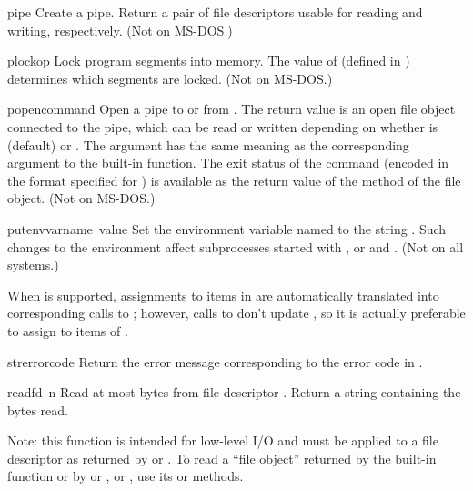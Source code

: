 \begin{funcdesc}{pipe}{}
Create a pipe.  Return a pair of file descriptors  usable for reading and writing, respectively.
(Not on MS-DOS.)
\end{funcdesc}

\begin{funcdesc}{plock}{op}
Lock program segments into memory.  The value of 
(defined in ) determines which segments are locked.
(Not on MS-DOS.)
\end{funcdesc}

\begin{funcdesc}{popen}{command}
Open a pipe to or from .  The return value is an open
file object connected to the pipe, which can be read or written
depending on whether  is  (default) or .
The  argument has the same meaning as the corresponding
argument to the built-in  function.  The exit status of
the command (encoded in the format specified for ) is
available as the return value of the  method of the file
object.
(Not on MS-DOS.)
\end{funcdesc}

\begin{funcdesc}{putenv}{varname\, value}
Set the environment variable named  to the string
.  Such changes to the environment affect subprocesses
started with ,  or
 and .  (Not on all systems.)

When  is
supported, assignments to items in  are automatically
translated into corresponding calls to ; however,
calls to  don't update , so it is
actually preferable to assign to items of .  
\end{funcdesc}

\begin{funcdesc}{strerror}{code}
Return the error message corresponding to the error code in .
\end{funcdesc}

\begin{funcdesc}{read}{fd\, n}
Read at most  bytes from file descriptor .
Return a string containing the bytes read.

Note: this function is intended for low-level I/O and must be applied
to a file descriptor as returned by  or
.  To read a ``file object'' returned by the
built-in function  or by  or
, or , use its
 or  methods.
\end{funcdesc}


